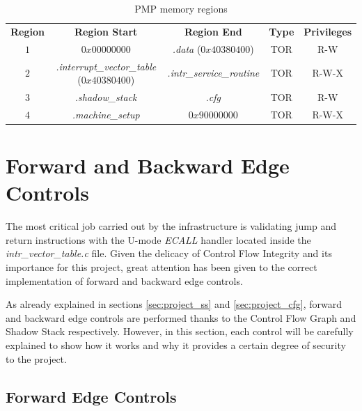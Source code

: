 \begin{table}
  \centering
  \begin{tabular}{|c|c|c|c|c|}
    \hline
    \textbf{Region}    & \textbf{Region Start}                             & \textbf{Region End}              & \textbf{Type} & \textbf{Privileges} \\
    \hhline{=====} $1$ & $0x00000000$                                      & \textit{.data} ($0x40380400$)    & TOR           & R-W                 \\
    \hline
    $2$                & \textit{.interrupt\_vector\_table} ($0x40380400$) & \textit{.intr\_service\_routine} & TOR           & R-W-X               \\
    \hline
    $3$                & \textit{.shadow\_stack}                           & \textit{.cfg}                    & TOR           & R-W                 \\
    \hline
    $4$                & \textit{.machine\_setup}                          & $0x90000000$                     & TOR           & R-W-X               \\
    \hline
  \end{tabular}
  \caption{PMP memory regions}
  \label{tab:pmpregions}
\end{table}

\section{Forward and Backward Edge Controls}
\label{sec:project_controls}

The most critical job carried out by the infrastructure is validating jump and return
instructions with the U-mode \textit{ECALL} handler located inside the \textit{intr\_vector\_table.c}
file. Given the delicacy of Control Flow Integrity and its importance for this
project, great attention has been given to the correct implementation of forward
and backward edge controls.

As already explained in sections \ref{sec:project_ss} and \ref{sec:project_cfg},
forward and backward edge controls are performed thanks to the Control Flow
Graph and Shadow Stack respectively. However, in this section, each control will
be carefully explained to show how it works and why it provides a certain degree
of security to the project.

\subsection{Forward Edge Controls}
\label{subsec:forward}

